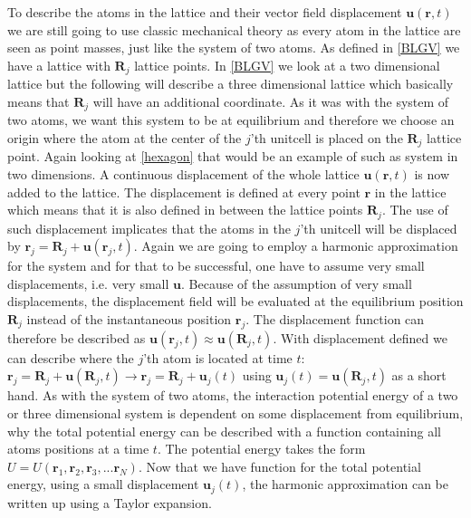 To describe the atoms in the lattice and their vector field displacement $\mathbf{u}(\mathbf{r},t)$ we are still going to use classic mechanical theory as every atom in the lattice are seen as point masses, just like the system of two atoms. As defined in \cref{BLGV} we have a lattice with $\mathbf{R}_{j}$ lattice points. In \cref{BLGV} we look at a two dimensional lattice but the following will describe a three dimensional lattice which basically means that $\mathbf{R}_{j}$ will have an additional coordinate. As it was with the system of two atoms, we want this system to be at equilibrium and therefore we choose an origin where the atom at the center of the $j$'th unitcell is placed on the $\mathbf{R}_{j}$ lattice point. Again looking at \cref{hexagon} that would be an example of such as system in two dimensions. A continuous displacement of the whole lattice $\mathbf{u}(\mathbf{r},t)$ is now added to the lattice. The displacement is defined at every point $\mathbf{r}$ in the lattice which means that it is also defined in between the lattice points $\mathbf{R}_{j}$. The use of such displacement implicates that the atoms in the $j$'th unitcell will be displaced by $\mathbf{r}_{j}=\mathbf{R}_{j}+\mathbf{u}(\mathbf{r}_{j},t)$. Again we are going to employ a harmonic approximation for the system and for that to be successful, one have to assume very small displacements, i.e. very small $\mathbf{u}$. Because of the assumption of very small displacements, the displacement field will be evaluated at the equilibrium position $\mathbf{R}_{j}$ instead of the instantaneous position $\mathbf{r}_{j}$. The displacement function can therefore be described as $\mathbf{u}(\mathbf{r}_{j},t)\approx \mathbf{u}(\mathbf{R}_{j},t)$. With displacement defined we can describe where the $j$'th atom is located at time $t$: $\mathbf{r}_{j}=\mathbf{R}_{j}+\mathbf{u}(\mathbf{R}_{j},t)\rightarrow \mathbf{r}_{j}=\mathbf{R}_{j}+\mathbf{u}_{j}(t)$ using $\mathbf{u}_{j}(t)=\mathbf{u}(\mathbf{R}_{j},t)$ as a short hand. As with the system of two atoms, the interaction potential energy of a two or three dimensional system is dependent on some displacement from equilibrium, why the total potential energy can be described with a function containing all atoms positions at a time $t$. The potential energy takes the form $U=U(\mathbf{r}_{1},\mathbf{r}_{2},\mathbf{r}_{3},...\mathbf{r}_{N})$. Now that we have function for the total potential energy, using a small displacement $\mathbf{u}_{j}(t)$, the harmonic approximation can be written up using a Taylor expansion.\begin{align}

\end{align}
